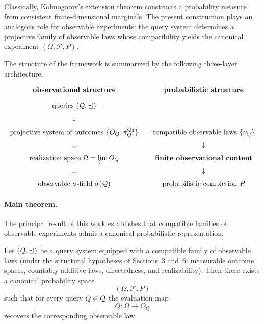 Classically, Kolmogorov's extension theorem constructs a probability
measure from consistent finite-dimensional marginals.  The present
construction plays an analogous role for observable experiments: the
query system determines a projective family of observable laws whose
compatibility yields the canonical experiment $(\Omega,\mathcal F,P)$.

The structure of the framework is summarized by the following
three-layer architecture.

\begin{center}
\[
\begin{array}{ccc}
\textbf{observational structure} & & \textbf{probabilistic structure} \\[10pt]

\text{queries } (\mathcal{Q},\preceq)
& & \\[6pt]

\downarrow
& & \\[6pt]

\text{projective system of outcomes } \{O_Q,\pi^{Q_2}_{Q_1}\}
& & \text{compatible observable laws } \{\nu_Q\} \\[6pt]

\downarrow
& & \downarrow \\[6pt]

\text{realization space }
\Omega=\varprojlim O_Q
& & \textbf{finite observational content} \\[6pt]

\downarrow
& & \downarrow \\[6pt]

\text{observable }\sigma\text{-field } \sigma(\mathcal{Q})
& & \text{probabilistic completion } P
\end{array}
\]
\end{center}

\paragraph{Main theorem.}
The principal result of this work establishes that compatible families
of observable experiments admit a canonical probabilistic
representation.

\begin{theorem}
Let $(\mathcal{Q},\preceq)$ be a query system equipped with a compatible
family of observable laws (under the structural hypotheses of
Sections~3 and~6: measurable outcome spaces, countably additive
laws, directedness, and realizability).  Then there exists a
canonical probability space
\[
(\Omega,\mathcal F,P)
\]
such that for every query $Q\in\mathcal{Q}$ the evaluation map
\[
Q:\Omega\to O_Q
\]
recovers the corresponding observable law.
\end{theorem}

